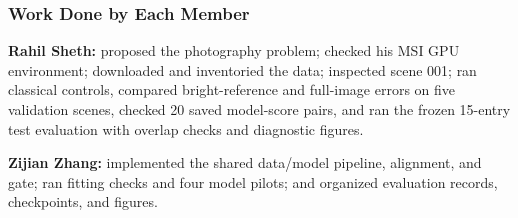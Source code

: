 \documentclass{article}
\begin{document}
\subsubsection*{Work Done by Each Member}
\textbf{Rahil Sheth:} proposed the photography problem; checked his MSI GPU environment; downloaded and inventoried the data; inspected scene 001; ran classical controls, compared bright-reference and full-image errors on five validation scenes, checked 20 saved model-score pairs, and ran the frozen 15-entry test evaluation with overlap checks and diagnostic figures.

\textbf{Zijian Zhang:} implemented the shared data/model pipeline, alignment, and gate; ran fitting checks and four model pilots; and organized evaluation records, checkpoints, and figures.

\clearpage


\end{document}
